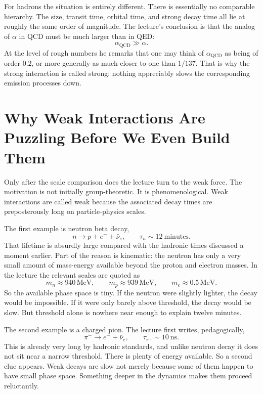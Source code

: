 For hadrons the situation is entirely different. There is essentially no comparable hierarchy. The size, transit time, orbital time, and strong decay time all lie at roughly the same order of magnitude. The lecture's conclusion is that the analog of \(\alpha\) in QCD must be much larger than in QED:
\begin{equation}
\alpha_{\mathrm{QCD}} \gg \alpha.
\end{equation}
At the level of rough numbers he remarks that one may think of \(\alpha_{\mathrm{QCD}}\) as being of order \(0.2\), or more generally as much closer to one than \(1/137\). That is why the strong interaction is called strong: nothing appreciably slows the corresponding emission processes down.

\section{Why Weak Interactions Are Puzzling Before We Even Build Them}

Only after the scale comparison does the lecture turn to the weak force. The motivation is not initially group-theoretic. It is phenomenological. Weak interactions are called weak because the associated decay times are preposterously long on particle-physics scales.

The first example is neutron beta decay,
\begin{equation}
n \to p + e^- + \bar\nu_e,
\qquad
\tau_n \sim 12\ \text{minutes}.
\end{equation}
That lifetime is absurdly large compared with the hadronic times discussed a moment earlier. Part of the reason is kinematic: the neutron has only a very small amount of mass-energy available beyond the proton and electron masses. In the lecture the relevant scales are quoted as
\begin{equation}
m_n \approx 940\,\mathrm{MeV},
\qquad
m_p \approx 939\,\mathrm{MeV},
\qquad
m_e \approx 0.5\,\mathrm{MeV}.
\end{equation}
So the available phase space is tiny. If the neutron were slightly lighter, the decay would be impossible. If it were only barely above threshold, the decay would be slow. But threshold alone is nowhere near enough to explain twelve minutes.

The second example is a charged pion. The lecture first writes, pedagogically,
\begin{equation}
\pi^- \to e^- + \bar\nu_e,
\qquad
\tau_{\pi^-}\sim 10\ \text{ns}.
\end{equation}
This is already very long by hadronic standards, and unlike neutron decay it does not sit near a narrow threshold. There is plenty of energy available. So a second clue appears. Weak decays are slow not merely because some of them happen to have small phase space. Something deeper in the dynamics makes them proceed reluctantly.

